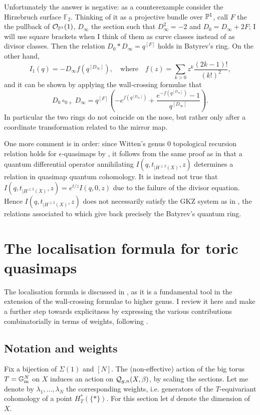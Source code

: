 Unfortunately the answer is negative: as a counterexample consider the Hirzebruch surface $\mathbb F_2$. Thinking of it as a projective bundle over $\mathbb P^1$, call $F$ the the pullback of $\mathcal{O}_{\mathbb P^1}(1)$, $D_\infty$ the section such that $D_\infty^2=-2$ and $D_0=D_\infty+2F$; I will use square brackets when I think of them as curve classes instead of as divisor classes. Then the relation $D_0*D_\infty=q^{[F]}$ holds in Batyrev's ring. On the other hand, \[I_1(q)=-D_\infty f(q^{[D_\infty]}), \quad \text{where}\quad f(z)=\sum_{k>0}z^k \frac{(2k-1)!}{(k!)^2},\] and it can be shown by applying the wall-crossing formulae that
\[ D_0\circ_{0+}D_\infty=q^{[F]}\left(-e^{f(q^{[D_\infty]})}+\frac{e^{-f(q^{[D_\infty]})}-1}{q^{[D_\infty]}}\right).\]
In particular the two rings do not coincide on the nose, but rather only after a coordinate transformation related to the mirror map.

One more comment is in order: since Witten's genus $0$ topological recursion relation holds for $\epsilon$-quasimaps by \cite[Corollary 2.3.4]{CF-K-higher-genus}, it follows from the same proof as in \cite[Theorem 10.3.1]{MS} that a quantum differential operator annihilating $I(q,t_{|H^{\leq 2}(X)},z)$ determines a relation in quasimap quantum cohomology. It is instead not true that $I(q,t_{|H^{\leq 2}(X)},z)=e^{t/z}I(q,0,z)$ due to the failure of the divisor equation. Hence $I(q,t_{|H^{\leq 2}(X)},z)$ does not necessarily satisfy the GKZ system as in \cite[\S 5.5.3]{MS}, the relations associated to which give back precisely the Batyrev's quantum ring.

\section{The localisation formula for toric quasimaps}\label{sec:loc_formula}
The localisation formula is discussed in \cite[\S 5]{CF-K-higher-genus}, as it is a fundamental tool in the extension of the wall-crossing formulae to higher genus. I review it here and make a further step towards explicitness by expressing the various contributions combinatorially in terms of weights, following \cite{HolgerSpielberg}.

\subsection{Notation and weights} Fix a bijection of $\Sigma(1)$ and $[N]$. The (non-effective) action of the big torus $T=\mathbb{G}_{\text{m}}^N$ on $X$ induces an action on $\mathcal{Q}_{g,n}(X,\beta)$, by scaling the sections. Let me denote by $\lambda_1,\ldots,\lambda_N$ the corresponding weights, i.e. generators of the $T$-equivariant cohomology of a point $H^*_T(\{*\})$. For this section let $d$ denote the dimension of $X$.

